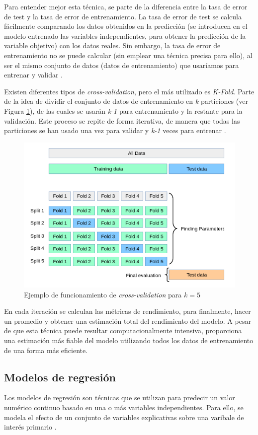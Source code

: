 \documentclass[12pt,a4paper]{article}
\begin{document}
Para entender mejor esta técnica, se parte de la diferencia entre la tasa de error de test y la tasa de error de entrenamiento. La tasa de error de test se calcula fácilmente comparando los datos obtenidos en la predicción (se introducen en el modelo entrenado las variables independientes, para obtener la predicción de la variable objetivo) con los datos reales. Sin embargo, la tasa de error de entrenamiento no se puede calcular (sin emplear una técnica precisa para ello), al ser el mismo conjunto de datos (datos de entrenamiento) que usaríamos para entrenar y validar \cite{gareth2013introduction}.


Existen diferentes tipos de \textit{cross-validation}, pero el más utilizado es \textit{K-Fold}. Parte de la idea de dividir el conjunto de datos de entrenamiento en \textit{k} particiones (ver Figura \ref{fig:cross-validation}), de las cuales se usarán \textit{k-1} para entrenamiento y la restante para la validación. Este proceso se repite de forma iterativa, de manera que todas las particiones se han usado una vez para validar y \textit{k-1} veces para entrenar \cite{hastie2009elements}.
\begin{figure}[H]
	\centering
	\includegraphics[width=0.7\linewidth]{figs/cross-validation}
	\caption{Ejemplo de funcionamiento de \textit{cross-validation} para $k = 5$ \cite{crossvalidation}}
	\label{fig:cross-validation}
\end{figure}
En cada iteración se calculan las métricas de rendimiento, para finalmente, hacer un promedio y obtener una estimación total del rendimiento del modelo.
A pesar de que esta técnica puede resultar computacionalmente intensiva, proporciona una estimación más fiable del modelo utilizando todos los datos de entrenamiento de una forma más eficiente.



\subsection{Modelos de regresión}
Los modelos de regresión son técnicas que se utilizan para predecir un valor numérico continuo basado en una o más variables independientes. Para ello, se modela el efecto de un conjunto de variables explicativas sobre una varibale de interés primario \autocite{fahrmeir2013regression}.
\end{document}
